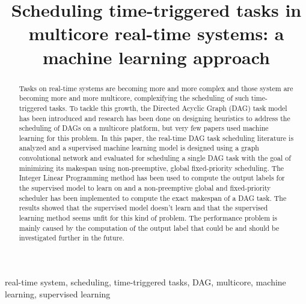\documentclass[conference]{IEEEtran}
\begin{document}
\title{Scheduling time-triggered tasks in multicore real-time systems: a machine learning approach\\
}

\author{
}

\maketitle
\thispagestyle{plain}

\begin{abstract}
Tasks on real-time systems are becoming more and more complex and
those system are becoming more and more multicore, complexifying
the scheduling of such time-triggered tasks.
To tackle this growth, the Directed Acyclic Graph (DAG) task model has been introduced and
research has been done on designing heuristics
to address the scheduling of DAGs on a multicore platform,
but very few papers used machine learning for this problem.  
In this paper, the real-time DAG task scheduling literature is analyzed 
and a supervised machine learning model is designed
using a graph convolutional network and evaluated 
for scheduling a single DAG task with the goal of minimizing its makespan 
using non-preemptive, global fixed-priority scheduling.
The Integer Linear Programming method has been 
used to compute the output labels for the supervised model to learn on
and a non-preemptive global and fixed-priority scheduler 
has been implemented to compute the exact makespan of a DAG task.
The results showed that the supervised model doesn't learn
and that the supervised learning method seems unfit 
for this kind of problem.
The performance problem is mainly caused by the computation of 
the output label that could be and should be 
investigated further in the future.
\end{abstract}

\begin{IEEEkeywords}
real-time system, scheduling, time-triggered tasks, DAG, multicore, machine learning, supervised learning
\end{IEEEkeywords}
\end{document}
